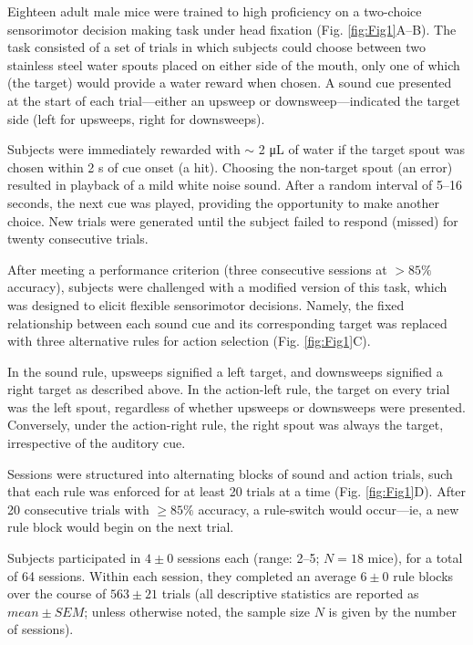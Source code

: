 Eighteen adult male mice were trained to high proficiency on a two-choice sensorimotor decision making task under head fixation (Fig. \ref{fig:Fig1}A--B). The task consisted of a set of trials in which subjects could choose between two stainless steel water spouts placed on either side of the mouth, only one of which (the target) would provide a water reward when chosen. A sound cue presented at the start of each trial---either an upsweep or downsweep---indicated the target side (left for upsweeps, right for downsweeps).



Subjects were immediately rewarded with $\sim$ 2 \si{\uL} of water if the target spout was chosen within 2 s of cue onset (a hit). Choosing the non-target spout (an error) resulted in playback of a mild white noise sound. After a random interval of 5--16 seconds, the next cue was played, providing the opportunity to make another choice. New trials were generated until the subject failed to respond (missed) for twenty consecutive trials.

After meeting a performance criterion (three consecutive sessions at $>85\%$  accuracy), subjects were challenged with a modified version of this task, which was designed to elicit flexible sensorimotor decisions. Namely, the fixed relationship between each sound cue and its corresponding target was replaced with three alternative rules for action selection (Fig. \ref{fig:Fig1}C). 

In the sound rule, upsweeps signified a left target, and downsweeps signified a right target as described above. In the action-left rule, the target on every trial was the left spout, regardless of whether upsweeps or downsweeps were presented. Conversely, under the action-right rule, the right spout was always the target, irrespective of the auditory cue. 

Sessions were structured into alternating blocks of sound and action trials, such that each rule was enforced for at least 20 trials at a time (Fig. \ref{fig:Fig1}D). After 20 consecutive trials with $\geq 85\%$  accuracy, a rule-switch would occur---ie, a new rule block would begin on the next trial.

Subjects participated in $4 \pm 0$ sessions each (range: 2--5; $N=18$ mice), for a total of 64 sessions. Within each session, they completed an average $6 \pm 0$ rule blocks over the course of $563 \pm 21$ trials (all descriptive statistics are reported as $\mathit{mean}\pm\mathit{SEM}$; unless otherwise noted, the sample size $N$ is given by the number of sessions).

